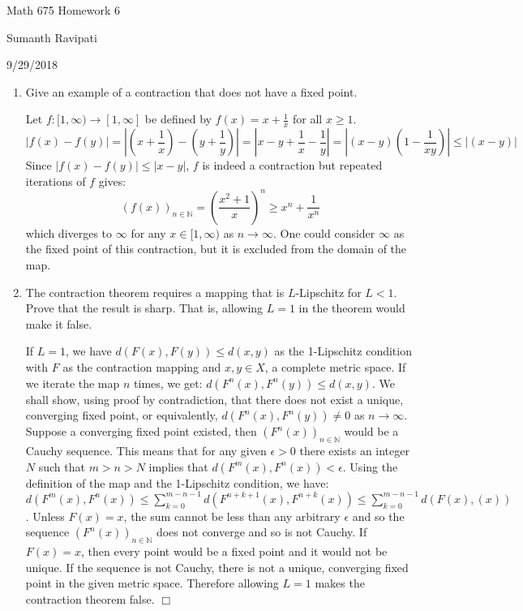 \documentclass[12pt,letterpaper,reqno]{amsart}
\newcommand{\N}{\mathbb N}
\begin{document}
\thispagestyle{empty}
\centerline{\Large Math 675 Homework 6}
\centerline{Sumanth Ravipati}
\centerline{9/29/2018}
\vspace{.15in}
\begin{enumerate}[1.]
\item Give an example of a contraction that does not have a fixed point.
\begin{flushleft}
Let $f:[1,\infty) \rightarrow [1,\infty]$ be defined by $f(x) = x + \frac{1}{x}$ for all $x \geq 1$.
$$|f(x) - f(y)| = \left|(x + \frac{1}{x}) - (y + \frac{1}{y})\right| = \left|x - y + \frac{1}{x} - \frac{1}{y}\right| = \left|(x - y) \left(1 - \frac{1}{xy} \right)\right| \leq |(x - y)|$$
Since $|f(x) - f(y)| \leq |x - y|$, $f$ is indeed a contraction but repeated iterations of $f$ gives:
$$(f(x))_{n\in\N} = \left(\frac{x^2+1}{x}\right)^n \geq x^n + \frac{1}{x^n}$$
which diverges to $\infty$ for any $x \in [1,\infty)$ as $n\rightarrow\infty$. One could consider $\infty$ as the fixed point of this contraction, but it is excluded from the domain of the map.
\end{flushleft}
\vspace{.15in}
\item The contraction theorem requires a mapping that is $L$-Lipschitz for $L<1$. Prove that the result is sharp. That is, allowing $L=1$ in the theorem would make it false.
\vspace{.15in}
\begin{flushleft}
If $L=1$, we have $d(F(x),F(y)) \leq d(x,y)$ as the 1-Lipschitz condition with $F$ as the contraction mapping and $x,y \in X$, a complete metric space. If we iterate the map $n$ times, we get: $d(F^n(x),F^n(y)) \leq d(x,y)$. We shall show, using proof by contradiction, that there does not exist a unique, converging fixed point, or equivalently, $d(F^n(x),F^n(y)) \not= 0$ as $n \rightarrow \infty$. Suppose a converging fixed point existed, then $(F^n(x))_{n\in\N}$ would be a Cauchy sequence. This means that for any given $\epsilon > 0$ there exists an integer $N$ such that $m>n>N$ implies that $d(F^m(x),F^n(x)) < \epsilon$. Using the definition of the map and the 1-Lipschitz condition, we have: $d \left(F^{m}(x),F^{n}(x)\right) \leq \sum\limits_{k=0}^{m-n-1} d \left(F^{n+k+1}(x), F^{n+k}(x) \right) \leq \sum\limits_{k=0}^{m-n-1} d(F(x),(x))$. Unless $F(x) = x$, the sum cannot be less than any arbitrary $\epsilon$ and so the sequence $(F^n(x))_{n\in\N}$ does not converge and so is not Cauchy. If $F(x) = x$, then every point would be a fixed point and it would not be unique. If the sequence is not Cauchy, there is not a unique, converging fixed point in the given metric space. Therefore allowing $L=1$ makes the contraction theorem false. $\Box$

\end{flushleft}
\end{enumerate}
\end{document}
